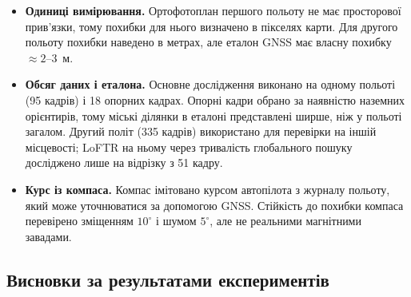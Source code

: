 \documentclass[a4paper, 12pt, titlepage]{article}
\begin{document}
\begin{itemize}
    \item \textbf{Одиниці вимірювання.} Ортофотоплан першого польоту не має просторової прив'язки, тому похибки для нього визначено в пікселях карти. Для другого польоту похибки наведено в метрах, але еталон GNSS має власну похибку $\approx 2$--$3$~м.
    \item \textbf{Обсяг даних і еталона.} Основне дослідження виконано на одному польоті (95 кадрів) і 18 опорних кадрах. Опорні кадри обрано за наявністю наземних орієнтирів, тому міські ділянки в еталоні представлені ширше, ніж у польоті загалом. Другий політ (335 кадрів) використано для перевірки на іншій місцевості; LoFTR на ньому через тривалість глобального пошуку досліджено лише на відрізку з 51 кадру.
    \item \textbf{Курс із компаса.} Компас імітовано курсом автопілота з журналу польоту, який може уточнюватися за допомогою GNSS. Стійкість до похибки компаса перевірено зміщенням $10^\circ$ і шумом $5^\circ$, але не реальними магнітними завадами.
\end{itemize}

\subsection{Висновки за результатами експериментів}
\end{document}
